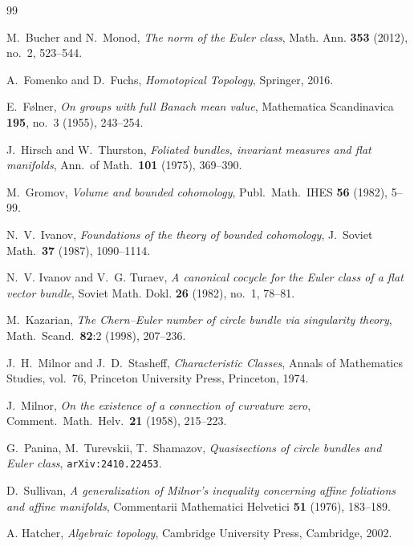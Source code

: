 \documentclass[12pt]{amsart}
\theoremstyle{plain}
\theoremstyle{definition}
\theoremstyle{plain}
\theoremstyle{definition}
\begin{document}
\begin{thebibliography}{99}


  M.~Bucher and N.~Monod, \emph{The norm of the Euler class}, Math. Ann. \textbf{353} (2012), no.~2, 523--544.

 A.~Fomenko and D.~Fuchs, \textit{Homotopical Topology}, Springer, 2016.

 E.~F{\o}lner, \textit{On groups with full Banach mean value}, Mathematica Scandinavica \textbf{195}, no.~3 (1955), 243--254.

 J.~Hirsch and W.~Thurston, \textit{Foliated bundles, invariant measures and flat manifolds}, Ann.\ of Math.\ \textbf{101} (1975), 369--390.

 M.~Gromov, \textit{Volume and bounded cohomology}, Publ.\ Math.\ IHES \textbf{56} (1982), 5--99.

 N.~V.~Ivanov, \textit{Foundations of the theory of bounded cohomology}, J.\ Soviet Math.\ \textbf{37} (1987), 1090--1114.

 N.~V. Ivanov and V.~G. Turaev, \emph{A canonical cocycle for the Euler class of a flat vector bundle}, Soviet Math. Dokl. \textbf{26} (1982), no.~1, 78--81.

 M.~Kazarian, \textit{The Chern--Euler number of circle bundle via singularity theory}, Math.\ Scand.\ \textbf{82}:2 (1998), 207--236.


 J.~H.~Milnor and J.~D.~Stasheff, \textit{Characteristic Classes}, Annals of Mathematics Studies, vol.~76, Princeton University Press, Princeton, 1974.

 J.~Milnor, \textit{On the existence of a connection of curvature zero}, Comment.\ Math.\ Helv.\ \textbf{21} (1958), 215--223.

 G.~Panina, M.~Turevskii, T.~Shamazov, \textit{Quasisections of circle bundles and Euler class}, \texttt{arXiv:2410.22453}.

 D.~Sullivan, \textit{A generalization of Milnor's inequality concerning affine foliations and affine manifolds}, Commentarii Mathematici Helvetici \textbf{51} (1976), 183--189.

  A. Hatcher, \textit{Algebraic topology}, Cambridge University Press, Cambridge, 2002.

\end{thebibliography}
\end{document}
